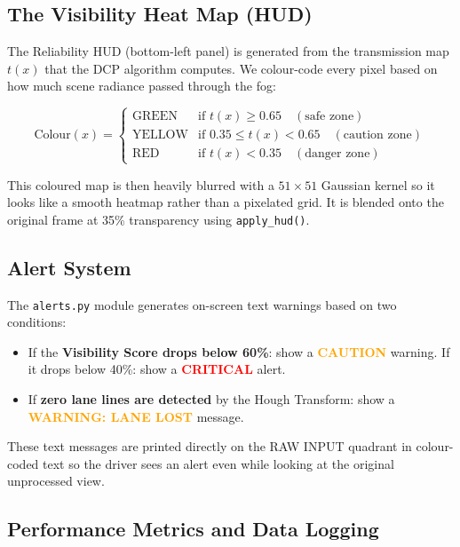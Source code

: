 \documentclass[12pt, a4paper]{article}
\begin{document}
\subsection{The Visibility Heat Map (HUD)}

The Reliability HUD (bottom-left panel) is generated from the transmission map
$t(x)$ that the DCP algorithm computes. We colour-code every pixel based on
how much scene radiance passed through the fog:

\begin{equation}
  \text{Colour}(x) = \begin{cases}
    \text{GREEN}  & \text{if } t(x) \geq 0.65 \quad (\text{safe zone})\\
    \text{YELLOW} & \text{if } 0.35 \leq t(x) < 0.65 \quad (\text{caution zone})\\
    \text{RED}    & \text{if } t(x) < 0.35 \quad (\text{danger zone})
  \end{cases}
\end{equation}

This coloured map is then heavily blurred with a $51 \times 51$ Gaussian kernel
so it looks like a smooth heatmap rather than a pixelated grid. It is blended
onto the original frame at 35\% transparency using \texttt{apply\_hud()}.

\subsection{Alert System}

The \texttt{alerts.py} module generates on-screen text warnings based on two
conditions:

\begin{itemize}
  \item If the \textbf{Visibility Score drops below 60\%}: show a
  \textcolor{orange}{\textbf{CAUTION}} warning. If it drops below 40\%:
  show a \textcolor{red}{\textbf{CRITICAL}} alert.
  \item If \textbf{zero lane lines are detected} by the Hough Transform: show
  a \textcolor{orange}{\textbf{WARNING: LANE LOST}} message.
\end{itemize}

These text messages are printed directly on the RAW INPUT quadrant in
colour-coded text so the driver sees an alert even while looking at the
original unprocessed view.

\subsection{Performance Metrics and Data Logging}
\end{document}
